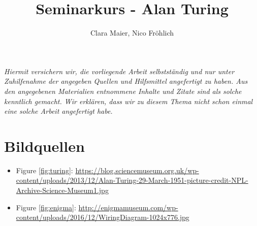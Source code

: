\documentclass[11pt,a4paper]{article}
\author{Clara Maier, Nico Fröhlich}
\title{Seminarkurs - Alan Turing}
\begin{document}
\maketitle
\newpage
\emph{Hiermit versichern wir, die vorliegende Arbeit selbstständig und nur unter Zuhilfenahme der angegeben Quellen und Hilfsmittel angefertigt zu haben. Aus den angegebenen Materialien entnommene Inhalte und Zitate sind als solche kenntlich gemacht. Wir erklären, dass wir zu diesem Thema nicht schon einmal eine solche Arbeit angefertigt habe.}
\newpage

\tableofcontents
\newpage





\section*{Bildquellen}
{\renewcommand\labelitemi{}
\begin{itemize}
\item Figure \ref{fig:turing}: \href{https://blog.sciencemuseum.org.uk/wp-content/uploads/2013/12/Alan-Turing-29-March-1951-picture-credit-NPL-Archive-Science-Museum1.jpg}{https://blog.sciencemuseum.org.uk/wp-content/uploads/2013/12/Alan-Turing-29-March-1951-picture-credit-NPL-Archive-Science-Museum1.jpg}
\item Figure \ref{fig:enigma}: \href{http://enigmamuseum.com/wp-content/uploads/2016/12/WiringDiagram-1024x776.jpg}{http://enigmamuseum.com/wp-content/uploads/2016/12/WiringDiagram-1024x776.jpg}
\end{itemize}
}



\end{document}
